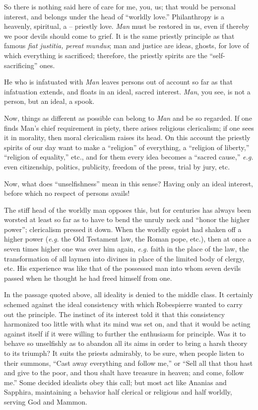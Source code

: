 \documentclass[12pt,a4paper]{book}
\begin{document}
So there is nothing said here of care for me, you, us; that would be personal 
interest, and belongs under the head of ``worldly love.'' Philanthropy is a 
heavenly, spiritual, a -- priestly love. \textit{Man} must be restored in us, 
even if thereby we poor devils should come to grief. It is the same priestly 
principle as that famous \textit{fiat justitia, pereat mundus}; man and 
justice are ideas, ghosts, for love of which everything is sacrificed; 
therefore, the priestly spirits are the ``self-sacrificing'' ones.

He who is infatuated with \textit{Man} leaves persons out of account so far as 
that infatuation extends, and floats in an ideal, sacred interest. 
\textit{Man}, you see, is not a person, but an ideal, a spook.

Now, things as different as possible can belong to \textit{Man} and be so 
regarded. If one finds Man's chief requirement in piety, there arises 
religious clericalism; if one sees it in morality, then moral clericalism 
raises its head. On this account the priestly spirits of our day want to make 
a ``religion'' of everything, a ``religion of liberty,'' ``religion of 
equality,'' etc., and for them every idea becomes a ``sacred cause,'' 
\textit{e.g.} even citizenship, politics, publicity, freedom of the press, 
trial by jury, etc.

Now, what does ``unselfishness'' mean in this sense? Having only an ideal 
interest, before which no respect of persons avails!

The stiff head of the worldly man opposes this, but for centuries has always 
been worsted at least so far as to have to bend the unruly neck and ``honor 
the higher power''; clericalism pressed it down. When the worldly egoist had 
shaken off a higher power (\textit{e.g.} the Old Testament law, the Roman 
pope, etc.), then at once a seven times higher one was over him again, 
\textit{e.g.} faith in the place of the law, the transformation of all laymen 
into divines in place of the limited body of clergy, etc. His experience was 
like that of the possessed man into whom seven devils passed when he thought 
he had freed himself from one.

In the passage quoted above, all ideality is denied to the middle class. It 
certainly schemed against the ideal consistency with which Robespierre wanted 
to carry out the principle. The instinct of its interest told it that this 
consistency harmonized too little with what its mind was set on, and that it 
would be acting against itself if it were willing to further the enthusiasm 
for principle. Was it to behave so unselfishly as to abandon all its aims in 
order to bring a harsh theory to its triumph? It suits the priests admirably, 
to be sure, when people listen to their summons, ``Cast away everything and 
follow me,'' or ``Sell all that thou hast and give to the poor, and thou 
shalt have treasure in heaven; and come, follow me.'' Some decided idealists 
obey this call; but most act like Ananias and Sapphira, maintaining a behavior 
half clerical or religious and half worldly, serving God and Mammon.
\end{document}
